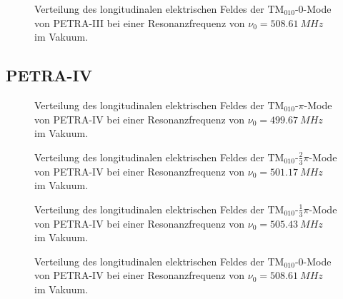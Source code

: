 \begin{figure}[p]
  \centering
  
  \caption[Feldverteilung der $\mathrm{TM}_{010}\text{-}0$-Mode von PETRA-III]{Verteilung des longitudinalen elektrischen Feldes der $\mathrm{TM}_{010}\text{-}0$-Mode von PETRA-III bei einer Resonanzfrequenz von \mbox{$\nu_0 = \SI{508.61}{MHz}$} im Vakuum.}
\end{figure}
\FloatBarrier

\clearpage
\subsection{PETRA-IV}
\FloatBarrier
\begin{figure}[h]
  \centering
  
  \caption[Feldverteilung der $\mathrm{TM}_{010}\text{-}\pi$-Mode von PETRA-IV]{Verteilung des longitudinalen elektrischen Feldes der $\mathrm{TM}_{010}\text{-}\pi$-Mode von PETRA-IV bei einer Resonanzfrequenz von \mbox{$\nu_0 = \SI{499.67}{MHz}$} im Vakuum.}
\end{figure}

\begin{figure}[p]
	\centering
  
	
	\caption[Feldverteilung der $\mathrm{TM}_{010}\text{-}\frac{2}{3}\pi$-Mode von PETRA-IV]{Verteilung des longitudinalen elektrischen Feldes der $\mathrm{TM}_{010}\text{-}\frac{2}{3}\pi$-Mode von PETRA-IV bei einer Resonanzfrequenz von \mbox{$\nu_0 = \SI{501.17}{MHz}$} im Vakuum.}
	
    
    \caption[Feldverteilung der $\mathrm{TM}_{010}\text{-}\frac{1}{3}\pi$-Mode von PETRA-IV]{Verteilung des longitudinalen elektrischen Feldes der $\mathrm{TM}_{010}\text{-}\frac{1}{3}\pi$-Mode von PETRA-IV bei einer Resonanzfrequenz von \mbox{$\nu_0 = \SI{505.43}{MHz}$} im Vakuum.}
\end{figure}

\begin{figure}[h]
  \centering
  
  \caption[Feldverteilung der $\mathrm{TM}_{010}\text{-}0$-Mode von PETRA-IV]{Verteilung des longitudinalen elektrischen Feldes der $\mathrm{TM}_{010}\text{-}0$-Mode von PETRA-IV bei einer Resonanzfrequenz von \mbox{$\nu_0 = \SI{508.61}{MHz}$} im Vakuum.}
\end{figure}
\FloatBarrier

\clearpage
